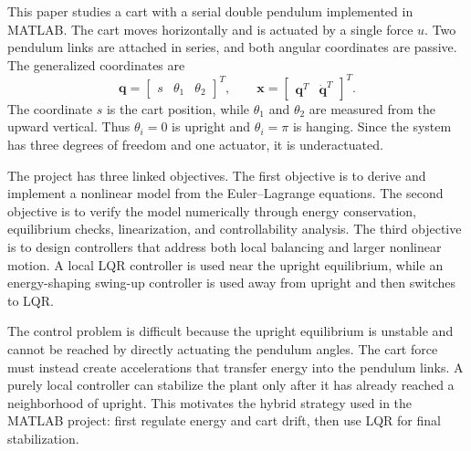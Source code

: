 \documentclass[11pt,a4paper]{article}
\begin{document}
This paper studies a cart with a serial double pendulum implemented in MATLAB. The cart moves horizontally and is actuated by a single force $u$. Two pendulum links are attached in series, and both angular coordinates are passive. The generalized coordinates are
\begin{equation}
    \bm q =
    \begin{bmatrix}
        s & \theta_1 & \theta_2
    \end{bmatrix}^{T},
    \qquad
    \bm x =
    \begin{bmatrix}
        \bm q^{T} & \dot{\bm q}^{T}
    \end{bmatrix}^{T}.
\end{equation}
The coordinate $s$ is the cart position, while $\theta_1$ and $\theta_2$ are measured from the upward vertical. Thus $\theta_i=0$ is upright and $\theta_i=\pi$ is hanging. Since the system has three degrees of freedom and one actuator, it is underactuated.

The project has three linked objectives. The first objective is to derive and implement a nonlinear model from the Euler--Lagrange equations. The second objective is to verify the model numerically through energy conservation, equilibrium checks, linearization, and controllability analysis. The third objective is to design controllers that address both local balancing and larger nonlinear motion. A local LQR controller is used near the upright equilibrium, while an energy-shaping swing-up controller is used away from upright and then switches to LQR.

The control problem is difficult because the upright equilibrium is unstable and cannot be reached by directly actuating the pendulum angles. The cart force must instead create accelerations that transfer energy into the pendulum links. A purely local controller can stabilize the plant only after it has already reached a neighborhood of upright. This motivates the hybrid strategy used in the MATLAB project: first regulate energy and cart drift, then use LQR for final stabilization.
\end{document}
